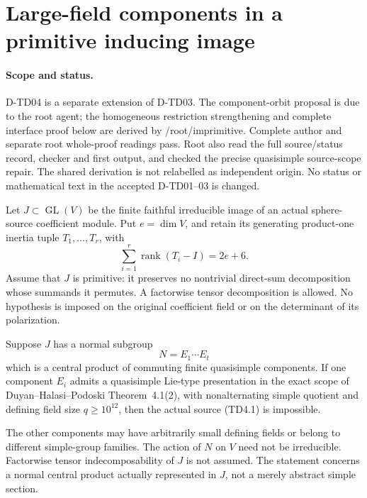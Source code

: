 \section{Large-field components in a primitive inducing image}
\label{sec:primitive-component-orbit}

\paragraph{Scope and status.}
D-TD04 is a separate extension of D-TD03.  The component-orbit
proposal is due to the root agent; the homogeneous restriction
strengthening and complete interface proof below are derived by
/root/imprimitive. Complete author and separate root whole-proof
readings pass. Root also read the full source/status record, checker
and first output, and checked the precise quasisimple source-scope
repair. The shared derivation is not relabelled as independent origin.
No status or mathematical text in the accepted D-TD01--03 is changed.

Let $J\subset\operatorname{GL}(V)$ be the finite faithful irreducible
image of an actual sphere-source coefficient module.  Put
$e=\dim V$, and retain its generating product-one inertia tuple
$T_1,\ldots,T_r$, with
\[
                  \sum_{i=1}^r\operatorname{rank}(T_i-I)=2e+6.
                  \tag{TD4.1}
\]
Assume that $J$ is primitive: it preserves no nontrivial direct-sum
decomposition whose summands it permutes.  A factorwise tensor
decomposition is allowed.  No hypothesis is imposed on the original
coefficient field or on the determinant of its polarization.

\begin{theorem}[D-TD04]
Suppose $J$ has a normal subgroup
\[
             N=E_1\cdots E_t
             \tag{TD4.2}
\]
which is a central product of commuting finite quasisimple components.
If one component $E_i$ admits a quasisimple Lie-type presentation
in the exact scope of Duyan--Halasi--Podoski Theorem~4.1(2),
with nonalternating simple quotient and defining field size
$q\ge10^{12}$, then the actual source (TD4.1) is impossible.

The other components may have arbitrarily small defining fields or
belong to different simple-group families.  The action of $N$ on $V$
need not be irreducible.  Factorwise tensor indecomposability of $J$
is not assumed.  The statement concerns a normal central product
actually represented in $J$, not a merely abstract simple section.
\end{theorem}


